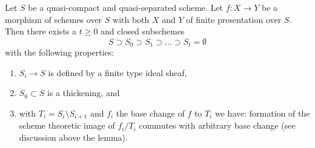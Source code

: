 \begin{lemma}
\label{lemma-base-change-scheme-theoretic-image}
Let $S$ be a quasi-compact and quasi-separated scheme.
Let $f : X \to Y$ be a morphism of schemes over $S$ with
both $X$ and $Y$ of finite presentation over $S$.
Then there exists a $t \geq 0$ and closed subschemes
$$
S \supset S_0 \supset S_1 \supset \ldots \supset S_t = \emptyset
$$
with the following properties:
\begin{enumerate}
\item $S_i \to S$ is defined by a finite type ideal sheaf,
\item $S_0 \subset S$ is a thickening, and
\item with $T_i = S_i \setminus S_{i + 1}$ and $f_i$ the base
change of $f$ to $T_i$ we have:
formation of the scheme theoretic image of $f_i/T_i$
commutes with arbitrary base change (see discussion above the lemma).
\end{enumerate}
\end{lemma}


